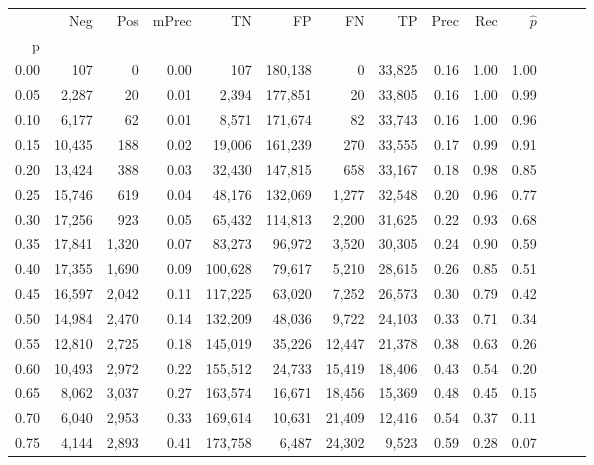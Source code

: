 \begin{tabular}{rrrrrrrrrrrrrr}
\toprule
{} &     Neg &    Pos & mPrec &       TN &       FP &      FN &      TP &  Prec &   Rec & $\hat{p}$ \\
p    &         &        &       &          &          &         &         &       &       &           \\
\midrule
0.00 &     107 &      0 &  0.00 &      107 &  180,138 &       0 &  33,825 &  0.16 &  1.00 &      1.00 \\
0.05 &   2,287 &     20 &  0.01 &    2,394 &  177,851 &      20 &  33,805 &  0.16 &  1.00 &      0.99 \\
0.10 &   6,177 &     62 &  0.01 &    8,571 &  171,674 &      82 &  33,743 &  0.16 &  1.00 &      0.96 \\
0.15 &  10,435 &    188 &  0.02 &   19,006 &  161,239 &     270 &  33,555 &  0.17 &  0.99 &      0.91 \\
0.20 &  13,424 &    388 &  0.03 &   32,430 &  147,815 &     658 &  33,167 &  0.18 &  0.98 &      0.85 \\
0.25 &  15,746 &    619 &  0.04 &   48,176 &  132,069 &   1,277 &  32,548 &  0.20 &  0.96 &      0.77 \\
0.30 &  17,256 &    923 &  0.05 &   65,432 &  114,813 &   2,200 &  31,625 &  0.22 &  0.93 &      0.68 \\
0.35 &  17,841 &  1,320 &  0.07 &   83,273 &   96,972 &   3,520 &  30,305 &  0.24 &  0.90 &      0.59 \\
0.40 &  17,355 &  1,690 &  0.09 &  100,628 &   79,617 &   5,210 &  28,615 &  0.26 &  0.85 &      0.51 \\
0.45 &  16,597 &  2,042 &  0.11 &  117,225 &   63,020 &   7,252 &  26,573 &  0.30 &  0.79 &      0.42 \\
0.50 &  14,984 &  2,470 &  0.14 &  132,209 &   48,036 &   9,722 &  24,103 &  0.33 &  0.71 &      0.34 \\
0.55 &  12,810 &  2,725 &  0.18 &  145,019 &   35,226 &  12,447 &  21,378 &  0.38 &  0.63 &      0.26 \\
0.60 &  10,493 &  2,972 &  0.22 &  155,512 &   24,733 &  15,419 &  18,406 &  0.43 &  0.54 &      0.20 \\
0.65 &   8,062 &  3,037 &  0.27 &  163,574 &   16,671 &  18,456 &  15,369 &  0.48 &  0.45 &      0.15 \\
0.70 &   6,040 &  2,953 &  0.33 &  169,614 &   10,631 &  21,409 &  12,416 &  0.54 &  0.37 &      0.11 \\
0.75 &   4,144 &  2,893 &  0.41 &  173,758 &    6,487 &  24,302 &   9,523 &  0.59 &  0.28 &      0.07 \\

\end{tabular}
